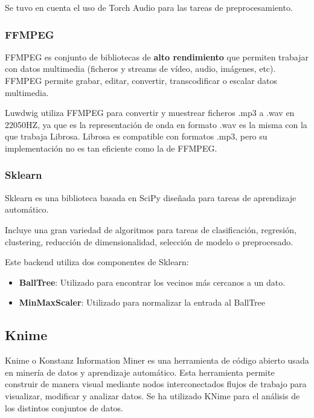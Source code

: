 Se tuvo en cuenta el uso de Torch Audio para las tareas de
preprocesamiento.

\hypertarget{ffmpeg}{%
\subsubsection{FFMPEG}\label{ffmpeg}}

FFMPEG es conjunto de bibliotecas de \textbf{alto rendimiento} que
permiten trabajar con datos multimedia (ficheros y streams de vídeo,
audio, imágenes, etc). FFMPEG permite grabar, editar, convertir,
transcodificar o escalar datos multimedia.

Luwdwig utiliza FFMPEG para convertir y muestrear ficheros .mp3 a
.wav en 22050HZ, ya que es la representación de onda en formato .wav es la misma con la que trabaja Librosa. 
Librosa es compatible con formatos .mp3, pero su implementación no es tan eficiente como la de FFMPEG. 
\hypertarget{section-2}{%
\subsubsection{}\label{section-2}}

\hypertarget{sklearn}{%
\subsubsection{Sklearn}\label{sklearn}}

Sklearn \cite{scikit-learn} es una biblioteca basada en SciPy \cite{2020SciPy-NMeth} diseñada para tareas de
aprendizaje automático.

Incluye una gran variedad de algoritmos para tareas de clasificación,
regresión, clustering, reducción de dimensionalidad, selección de modelo
o preprocesado.

Este backend utiliza dos componentes de Sklearn:

\begin{itemize}
\itemsep0em 
\item
  \textbf{BallTree}: Utilizado para encontrar los vecinos más cercanos a
  un dato.
\item
  \textbf{MinMaxScaler}: Utilizado para normalizar la entrada al
  BallTree
\end{itemize}

\subsection{Knime}\label{knime}
Knime o Konstanz Information Miner es una herramienta de código abierto usada en minería de datos y aprendizaje automático. Esta herramienta permite construir de manera visual mediante nodos interconectados flujos de trabajo para visualizar, modificar y analizar datos.
Se ha utilizado KNime para el análisis de los distintos conjuntos de datos. 

